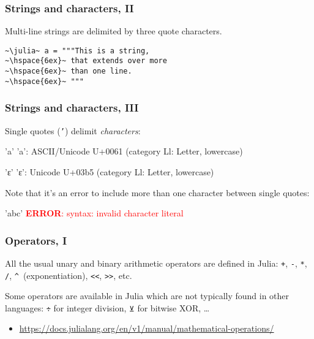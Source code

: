 \documentclass[english,serif,mathserif,xcolor=pdftex,dvipsnames,table]{beamer}
\begin{document}
\begin{frame}[fragile]
  \frametitle{Strings and characters, II}
  Multi-line strings are delimited by three quote characters.
\begin{lstlisting}[showstringspaces=false]
~\julia~ a = """This is a string,
~\hspace{6ex}~ that extends over more
~\hspace{6ex}~ than one line.
~\hspace{6ex}~ """
\end{lstlisting}
\end{frame}


\begin{frame}
  \frametitle{Strings and characters, III}
  Single quotes (\texttt{'}) delimit \emph{characters}:
\begin{semiverbatim}\smaller
\julia 'a'
'a': ASCII/Unicode U+0061 (category Ll: Letter, lowercase)

\julia 'ε'
'ε': Unicode U+03b5 (category Ll: Letter, lowercase)
\end{semiverbatim}

  \+ Note that it's an error to include more than one character
  between single quotes:
\begin{semiverbatim}
\julia 'abc'
\textcolor{red}{\textbf{ERROR}: syntax: invalid character literal}
\end{semiverbatim}
\end{frame}


\begin{frame}[fragile]
  \frametitle{Operators, I}
  All the usual unary and binary arithmetic operators are
  defined in Julia: \texttt{+}, \texttt{-}, \texttt{*}, \texttt{/},
  \texttt{\textasciicircum}~(exponentiation), \texttt{<{}<}, \texttt{>{}>}, etc.

  \+ Some operators are available in Julia which are not typically
  found in other languages: \texttt{÷} for integer division,
  \texttt{⊻} for bitwise XOR, \ldots

  \+
  \begin{references}
    \tiny
    \begin{itemize}
    \item \url{https://docs.julialang.org/en/v1/manual/mathematical-operations/}
    \end{itemize}
  \end{references}
\end{frame}
\end{document}
